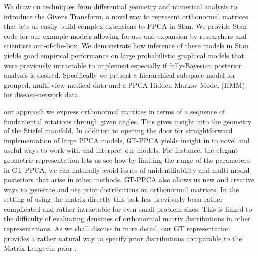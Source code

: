 \documentclass{article}
\begin{document}
We draw on techniques from differential geometry and numerical analysis to introduce the Givens Transform, a novel way to represent orthonormal matrices that lets us easily build complex extensions to PPCA in Stan. We provide Stan code for our example models allowing for use and expansion by researchers and scientists out-of-the-box. We demonstrate how inference of these models in Stan yields good empirical performance on large probabilistic graphical models that were previously intractable to implement especially if fully-Bayesian posterior analysis is desired. Specifically we present a hierarchical subspace model for grouped, multi-view medical data and a PPCA Hidden Markov Model (HMM) for disease-network data.

our approach we express orthonormal matrices in terms of a sequence of fundamental rotations through given angles. This gives insight into the geometry of the Stiefel manifold. In addition to opening the door for straightforward implementation of large PPCA models, GT-PPCA yields insight in to novel and useful ways to work with and interpret our models.  For instance, the elegant geometric representation lets us see how by limiting the range of the parameters in GT-PPCA, we can naturally avoid issues of unidentifiability and multi-modal posteriors that arise in other methods.  GT-PPCA also allows us new and creative ways to generate and use prior distributions on orthonormal matrices.  In the setting of using the matrix directly this task has previously been rather complicated and rather intractable for even small problem sizes.  This is linked to the difficulty of evaluating densities of orthonormal matrix distributions in other representations.  As we shall discuss in more detail, our GT representation provides a rather natural way to specify prior distributions comparable to the Matrix Langevin prior \citep{muirhead2009aspects}.

\end{document}
